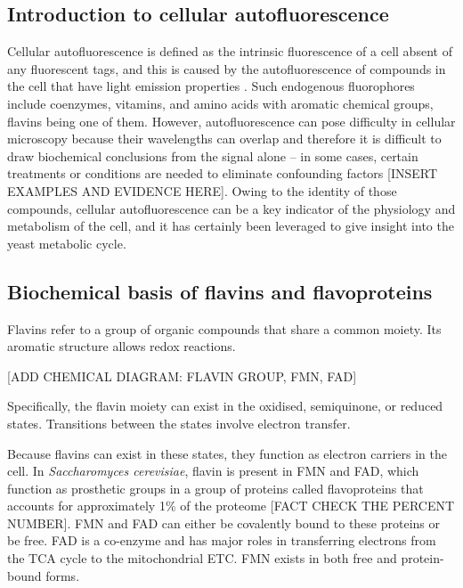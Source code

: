 \subsection{Introduction to cellular autofluorescence}
\label{subsec:intro-flavin-autofluo}

Cellular autofluorescence is defined as the intrinsic fluorescence of a cell absent of any fluorescent tags, and this is caused by the autofluorescence of compounds in the cell that have light emission properties \parencite{maslankaAutofluorescenceYeastSaccharomyces2018}.
Such endogenous fluorophores include coenzymes, vitamins, and amino acids with aromatic chemical groups, flavins being one of them.
However, autofluorescence can pose difficulty in cellular microscopy because their wavelengths can overlap and therefore it is difficult to draw biochemical conclusions from the signal alone -- in some cases, certain treatments or conditions are needed to eliminate confounding factors [INSERT EXAMPLES AND EVIDENCE HERE].
Owing to the identity of those compounds, cellular autofluorescence can be a key indicator of the physiology and metabolism of the cell, and it has certainly been leveraged to give insight into the yeast metabolic cycle.

\subsection{Biochemical basis of flavins and flavoproteins}
\label{subsec:intro-flavin-biochem}
Flavins refer to a group of organic compounds that share a common moiety.
Its aromatic structure allows redox reactions.

[ADD CHEMICAL DIAGRAM: FLAVIN GROUP, FMN, FAD]

Specifically, the flavin moiety can exist in the oxidised, semiquinone, or reduced states.
Transitions between the states involve electron transfer.

Because flavins can exist in these states, they function as electron carriers in the cell.
In \emph{Saccharomyces cerevisiae}, flavin is present in FMN and FAD, which function as prosthetic groups in a group of proteins called flavoproteins that accounts for approximately 1\% of the proteome [FACT CHECK THE PERCENT NUMBER].
FMN and FAD can either be covalently bound to these proteins or be free.
FAD is a co-enzyme and has major roles in transferring electrons from the TCA cycle to the mitochondrial ETC.
FMN exists in both free and protein-bound forms.

